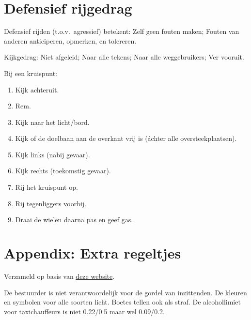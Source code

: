 \section{Defensief rijgedrag}
\begin{outline}
\vspace{-0.25em}
\1 Defensief rijden (t.o.v.\ agressief) betekent:
	\2 Zelf geen fouten maken;
	\2 Fouten van anderen anticiperen, opmerken, en tolereren.

\1 Kijkgedrag:
	\2 Niet afgeleid;
	\2 Naar alle tekens;
	\2 Naar alle weggebruikers;
	\2 Ver vooruit.

\1 Bij een kruispunt:
\begin{enumerate}
	\item Kijk achteruit.
	\item Rem.
	\item Kijk naar het licht/bord.
	\item Kijk of de doelbaan aan de overkant vrij is (áchter alle oversteekplaatsen).
	\item Kijk links (nabij gevaar).
	\item Kijk rechts (toekomstig gevaar).
	\item Rij het kruispunt op.
	\item Rij tegenliggers voorbij.
	\item Draai de wielen daarna pas en geef gas.
\end{enumerate}
\end{outline}

\section{Appendix: Extra regeltjes}
Verzameld op basis van \href{https://mijnrijbewijs.eu/}{deze website}.
\begin{outline}
\1 De bestuurder is niet verantwoordelijk voor de gordel van inzittenden.
\1 De kleuren en symbolen voor alle soorten licht.
\1 Boetes tellen ook als straf.
\1 De alcohollimiet voor taxichauffeurs is niet 0.22/0.5 maar wel 0.09/0.2.
\end{outline}